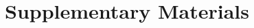 \documentclass{llncs}
\theoremstyle{plain}
\theoremstyle{definition}
\begin{document}

\newpage
\section*{\LARGE Supplementary Materials}

\appendix
%




%
% 
% 
% 
%







%
% 
\end{document}

